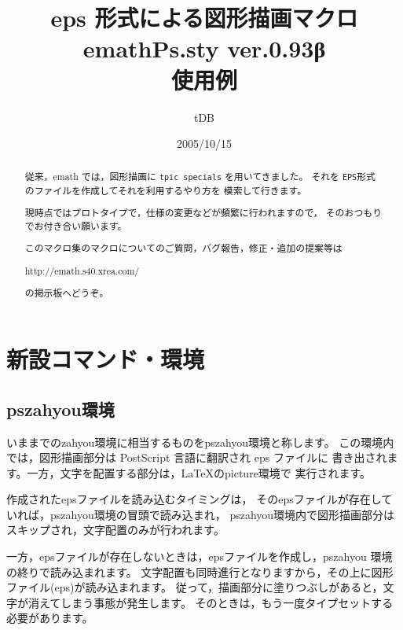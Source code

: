 \documentclass[a4j]{jarticle}
\begin{document}
\title{eps 形式による図形描画マクロ\\
emathPs.sty {\normalsize ver.0.93β}\\使用例}
\author{tDB}
\date{2005/10/15}

\maketitle\thispagestyle{empty}
\begin{abstract}%
\zw%
従来，emath では，図形描画に \texttt{tpic specials} を用いてきました。
それを \texttt{EPS}形式のファイルを作成してそれを利用するやり方を
模索して行きます。


現時点ではプロトタイプで，仕様の変更などが頻繁に行われますので，
そのおつもりでお付き合い願います。

このマクロ集のマクロについてのご質問，バグ報告，修正・追加の提案等は
\begin{center}
http://emath.s40.xrea.com/
\end{center}
の掲示板へどうぞ。
\end{abstract}
\pagebreak
{}%


\tableofcontents

\pagebreak


\section{新設コマンド・環境}
\subsection{\textsf{pszahyou}環境}
いままでの\textsf{zahyou}環境に相当するものを\textsf{pszahyou}環境と称します。
この環境内では，図形描画部分は PostScript 言語に翻訳され eps ファイルに
書き出されます。一方，文字を配置する部分は，\LaTeX の\textsf{picture}環境で
実行されます。

作成されたepsファイルを読み込むタイミングは，
そのepsファイルが存在していれば，\textsf{pszahyou}環境の冒頭で読み込まれ，
\textsf{pszahyou}環境内で図形描画部分はスキップされ，文字配置のみが行われます。

一方，epsファイルが存在しないときは，epsファイルを作成し，\textsf{pszahyou}
環境の終りで読み込まれます。
文字配置も同時進行となりますから，その上に図形ファイル(eps)が読み込まれます。
従って，描画部分に塗りつぶしがあると，文字が消えてしまう事態が発生します。
そのときは，もう一度タイプセットする必要があります。
\end{document}
